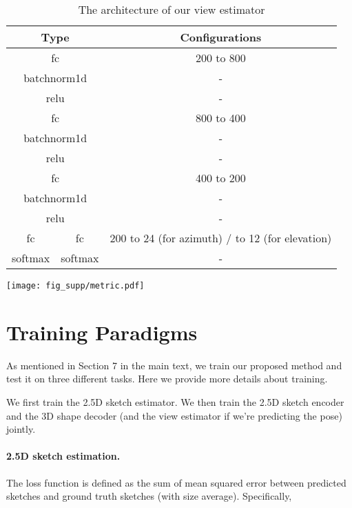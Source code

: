 \documentclass[10pt,twocolumn,letterpaper]{article}
\newcommand{\myparagraph}[1]{\vspace{-14pt}\paragraph{#1}}
\newcommand{\data}{Pix3D\xspace}
\begin{document}
    	\begin{table}[t]
         	\centering
         	\setlength{\tabcolsep}{1pt}
            \begin{tabular}{ccc}
            \toprule
            \multicolumn{2}{c}{Type} & Configurations\\
            \midrule
            \multicolumn{2}{c}{fc} & 200 to 800 \\
            \multicolumn{2}{c}{batchnorm1d} & - \\
            \multicolumn{2}{c}{relu} & - \\
            \multicolumn{2}{c}{fc} & 800 to 400 \\
            \multicolumn{2}{c}{batchnorm1d} & - \\
            \multicolumn{2}{c}{relu} & - \\
            \multicolumn{2}{c}{fc} & 400 to 200 \\
            \multicolumn{2}{c}{batchnorm1d} & - \\
            \multicolumn{2}{c}{relu} & - \\
            fc & fc & 200 to 24 (for azimuth) / to 12 (for elevation) \\
            softmax & softmax & - \\
            \bottomrule
            \end{tabular}
            \caption{The architecture of our view estimator}
            \label{tbl:net_4}
        \end{table} \begin{figure*}[t!]
\centering
\texttt{[image: fig\_supp/metric.pdf]}
\caption{Three nearest neighbors retrieved from \data using different metrics. EMD and CD work slightly better than IoU.}
\label{fig:metric}
\end{figure*}
 
\section{Training Paradigms}
\label{sec:train_para}

As mentioned in Section 7 in the main text, we train our proposed method and test it on three different tasks. Here we provide more details about training.

We first train the 2.5D sketch estimator. We then train the 2.5D sketch encoder and the 3D shape decoder (and the view estimator if we're predicting the pose) jointly.

\myparagraph{2.5D sketch estimation. }
The loss function is defined as the sum of mean squared error between predicted sketches and ground truth sketches (with size average). Specifically,
\end{document}
